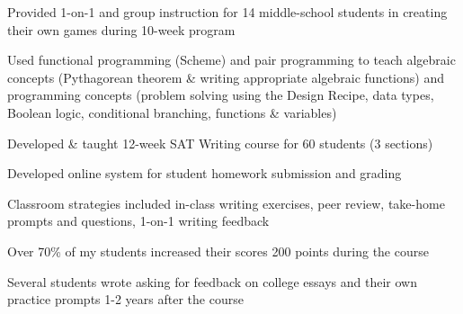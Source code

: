 \documentclass[letterpaper]{deedy-resume} %
\begin{document}
\begin{minipage}[t]{0.66\textwidth}
\sectionspace %



\begin{tightitemize}
\item Provided 1-on-1 and group instruction for 14 middle-school students in creating their own games during 10-week program 
\item Used functional programming (Scheme) and pair programming to teach algebraic concepts (Pythagorean theorem \& writing appropriate algebraic functions) and programming concepts (problem solving using the Design Recipe, data types, Boolean logic, conditional branching, functions \& variables)
\end{tightitemize}

\sectionspace %



\begin{tightitemize}
\item Developed \& taught 12-week SAT Writing course for 60 students (3 sections)
\item Developed online system for student homework submission and grading  
\item Classroom strategies included in-class writing exercises, peer review, take-home prompts and questions, 1-on-1 writing feedback
\item Over 70\% of my students increased their scores 200 points during the course
\item Several students wrote asking for feedback on college essays and their own practice prompts 1-2 years after the course
\end{tightitemize} 


\end{minipage}
\end{document}
